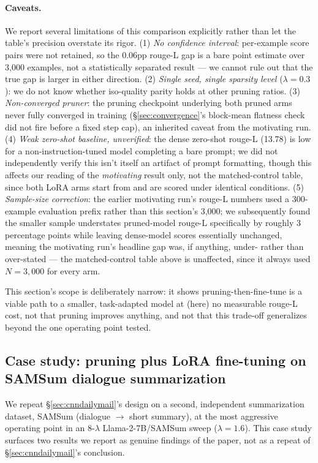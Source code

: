 \documentclass[11pt]{article}
\begin{document}
\paragraph{Caveats.} We report several limitations of this comparison
explicitly rather than let the table's precision overstate its rigor. (1)
\emph{No confidence interval}: per-example score pairs were not retained, so
the 0.06pp rouge-L gap is a bare point estimate over 3{,}000 examples, not a
statistically separated result --- we cannot rule out that the true gap is
larger in either direction. (2) \emph{Single seed, single sparsity level}
($\lambda=0.3$): we do not know whether iso-quality parity holds at other
pruning ratios. (3) \emph{Non-converged pruner}: the pruning checkpoint
underlying both pruned arms never fully converged in training
(\S\ref{sec:convergence}'s block-mean flatness check did not fire before a
fixed step cap), an inherited caveat from the motivating run. (4)
\emph{Weak zero-shot baseline, unverified}: the dense zero-shot rouge-L
(13.78) is low for a non-instruction-tuned model completing a bare prompt;
we did not independently verify this isn't itself an artifact of prompt
formatting, though this affects our reading of the \emph{motivating} result
only, not the matched-control table, since both LoRA arms start from and are
scored under identical conditions. (5) \emph{Sample-size correction}: the
earlier motivating run's rouge-L numbers used a 300-example evaluation
prefix rather than this section's 3{,}000; we subsequently found the smaller
sample understates pruned-model rouge-L specifically by roughly 3 percentage
points while leaving dense-model scores essentially unchanged, meaning the
motivating run's headline gap was, if anything, under- rather than
over-stated --- the matched-control table above is unaffected, since it
always used $N=3{,}000$ for every arm.

This section's scope is deliberately narrow: it shows pruning-then-fine-tune
is a viable path to a smaller, task-adapted model at (here) no measurable
rouge-L cost, not that pruning improves anything, and not that this
trade-off generalizes beyond the one operating point tested.

\subsection{Case study: pruning plus LoRA fine-tuning on SAMSum dialogue summarization}
\label{sec:samsum}

We repeat \S\ref{sec:cnndailymail}'s design on a second, independent
summarization dataset, SAMSum (dialogue $\to$ short summary), at the most
aggressive operating point in an 8-$\lambda$ Llama-2-7B/SAMSum sweep
($\lambda=1.6$). This case study surfaces two results we report as genuine
findings of the paper, not as a repeat of \S\ref{sec:cnndailymail}'s
conclusion.
\end{document}
